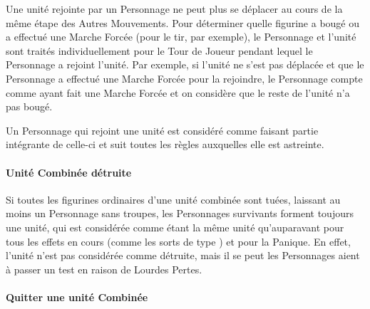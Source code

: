 
Une unité rejointe par un Personnage ne peut plus se déplacer au cours de la même étape des Autres Mouvements. Pour déterminer quelle figurine a bougé ou a effectué une Marche Forcée (pour le tir, par exemple), le Personnage et l'unité sont traités individuellement pour le Tour de Joueur pendant lequel le Personnage a rejoint l'unité. Par exemple, si l'unité ne s'est pas déplacée et que le Personnage a effectué une Marche Forcée pour la rejoindre, le Personnage compte comme ayant fait une Marche Forcée et on considère que le reste de l'unité n'a pas bougé.

Un Personnage qui rejoint une unité est considéré comme faisant partie intégrante de celle-ci et suit toutes les règles auxquelles elle est astreinte.

\newpage
\paragraph{Unité Combinée détruite}

Si toutes les figurines ordinaires d'une unité combinée sont tuées, laissant au moins un Personnage sans troupes, les Personnages survivants forment toujours une unité, qui est considérée comme étant la même unité qu'auparavant pour tous les effets en cours (comme les sorts de type \lastsoneturn{}) et pour la Panique. En effet, l'unité n'est pas considérée comme détruite, mais il se peut les Personnages aient à passer un test en raison de Lourdes Pertes.

\paragraph{Quitter une unité Combinée}
\label{leaving_a_combined_unit}

